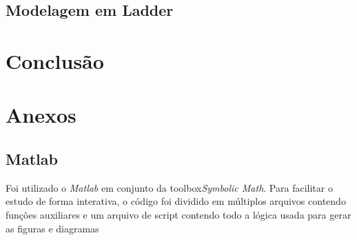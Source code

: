 \documentclass[a4paper,11pt]{article}
\begin{document}
\subsection{Modelagem em Ladder}

\section{Conclusão}

\newpage


\newpage
\section*{Anexos}



\subsection*{Matlab}

Foi utilizado o \textit{Matlab} em conjunto da toolbox\textit{Symbolic Math}\cite{matlabsymbolic}. Para facilitar o estudo de forma interativa, o código foi dividido em múltiplos arquivos contendo funções auxiliares e um arquivo de script contendo todo a lógica usada para gerar as figuras e diagramas
\end{document}

